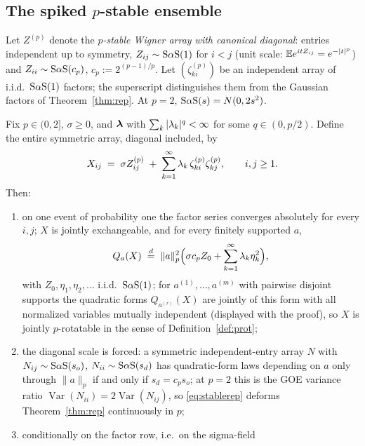 \subsection{The spiked $p$-stable ensemble}

Let $Z^{(p)}$ denote the \emph{$p$-stable Wigner array with canonical
diagonal}: entries independent up to symmetry, $Z_{ij}\sim\mathrm{S}\alpha\mathrm{S}(1)$ for
$i<j$ (unit scale: $\mathbb{E} e^{itZ_{ij}}=e^{-|t|^p}$) and
$Z_{ii}\sim\mathrm{S}\alpha\mathrm{S}(c_p)$, $c_p:=2^{(p-1)/p}$. Let
$(\zeta^{(p)}_{ki})$ be an independent array of i.i.d.\ $\mathrm{S}\alpha\mathrm{S}(1)$
factors; the superscript distinguishes them from the Gaussian factors
of Theorem~\ref{thm:rep}. At $p=2$, $\mathrm{S}\alpha\mathrm{S}(s)=N(0,2s^2)$.

\begin{theorem}
\label{thm:stable}
Fix $p\in(0,2]$, $\sigma\ge0$, and $\bm{\lambda}$ with
$\sum_k|\lambda_k|^{q}<\infty$ for some $q\in(0,p/2)$. Define the entire
symmetric array, diagonal included, by
\begin{equation}
\label{eq:stablerep}
X_{ij} \;=\; \sigma Z^{(p)}_{ij}
\;+\; \sum_{k=1}^{\infty} \lambda_k\,\zeta^{(p)}_{ki}\zeta^{(p)}_{kj},
\qquad i,j\ge1.
\end{equation}
Then:
\begin{enumerate}[label=(\roman*),itemsep=1pt,topsep=2pt]
\item on one event of probability one the factor series converges
absolutely for every $i,j$; $X$ is jointly exchangeable, and for every
finitely supported $a$,
\begin{equation}
\label{eq:stable-qf}
Q_a(X)\;\overset{d}{=}\;\lVert a\rVert_p^2
\Bigl(\sigma c_p Z_0+\sum_{k=1}^{\infty}\lambda_k\eta_k^2\Bigr),
\end{equation}
with $Z_0,\eta_1,\eta_2,\dots$ i.i.d.\ $\mathrm{S}\alpha\mathrm{S}(1)$; for $a^{(1)},\dots,a^{(m)}$ with pairwise disjoint supports the
quadratic forms $Q_{a^{(r)}}(X)$ are jointly of this form with all
normalized variables mutually independent (displayed with the proof), so $X$ is jointly $p$-rotatable in the sense of
Definition~\ref{def:prot};
\item the diagonal scale is forced: a symmetric independent-entry
array $N$ with $N_{ij}\sim\mathrm{S}\alpha\mathrm{S}(s_o)$, $N_{ii}\sim\mathrm{S}\alpha\mathrm{S}(s_d)$ has
quadratic-form laws depending on $a$ only through $\lVert a\rVert_p$
if and only if $s_d=c_ps_o$; at $p=2$ this is the GOE variance ratio
$\operatorname{Var}(N_{ii})=2\operatorname{Var}(N_{ij})$, so
\eqref{eq:stablerep} deforms Theorem~\ref{thm:rep} continuously in
$p$;
\item conditionally on the factor row, i.e.\ on the sigma-field

\end{enumerate}
\end{theorem}
